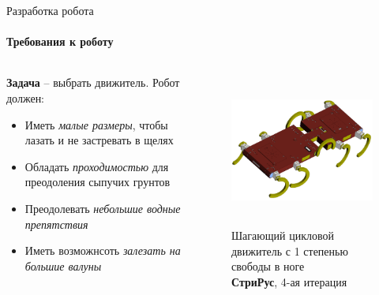 \documentclass[aspectratio=169,xcolor=table]{beamer}
\begin{document}
\begin{frame}[t]{Разработка робота}
    \framesubtitle{Требования к роботу}
    \large
\vspace{-0.5cm}
    \begin{columns}[T,onlytextwidth]
        \begin{column}{0.49\textwidth}
            \textbf{Задача} --  выбрать движитель. Робот должен:
            \begin{itemize}
                \item Иметь \textit{малые размеры}, чтобы лазать и не застревать в щелях
                \item Обладать \textit{проходимостью} для преодоления сыпучих грунтов
                \item Преодолевать \textit{небольшие водные препятствия}
                \item Иметь возможнсоть \textit{залезать на большие валуны}
            \end{itemize}        
        \end{column}
        \begin{column}{0.49\textwidth}
            \vspace{-1.1cm}
            \begin{figure}[H]
                \centering\includegraphics[height=5cm,width=1\textwidth,keepaspectratio]{strirus_4.png}
                \caption*{Шагающий цикловой движитель с 1 степенью свободы в ноге \\ \textbf{СтриРус}, 4-ая итерация}
                \label{fig:strirus_4.png}
            \end{figure}
        \end{column}
    \end{columns}
\end{frame}
\end{document}
